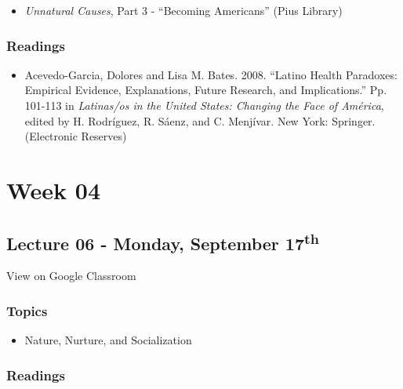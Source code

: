 \documentclass[]{book}
\providecommand{\tightlist}{%
  \setlength{\itemsep}{0pt}\setlength{\parskip}{0pt}}
\theoremstyle{definition}
\theoremstyle{definition}
\theoremstyle{definition}
\theoremstyle{remark}
\begin{document}
\begin{itemize}
\tightlist
\item
  \emph{Unnatural Causes}, Part 3 - ``Becoming Americans'' (Pius
  Library)
\end{itemize}

\hypertarget{readings-5}{%
\subsubsection*{Readings}\label{readings-5}}

\begin{itemize}
\tightlist
\item
  Acevedo-Garcia, Dolores and Lisa M. Bates. 2008. ``Latino Health
  Paradoxes: Empirical Evidence, Explanations, Future Research, and
  Implications.'' Pp. 101-113 in \emph{Latinas/os in the United States:
  Changing the Face of América}, edited by H. Rodríguez, R. Sáenz, and
  C. Menjívar. New York: Springer. (Electronic Reserves)
\end{itemize}

\hypertarget{week-04}{%
\section*{Week 04}\label{week-04}}

\hypertarget{lecture-06---monday-september-17th}{%
\subsection*{\texorpdfstring{Lecture 06 - Monday, September
17\textsuperscript{th}}{Lecture 06 - Monday, September 17th}}\label{lecture-06---monday-september-17th}}

View on Google Classroom

\hypertarget{topics-6}{%
\subsubsection*{Topics}\label{topics-6}}

\begin{itemize}
\tightlist
\item
  Nature, Nurture, and Socialization
\end{itemize}

\hypertarget{readings-6}{%
\subsubsection*{Readings}\label{readings-6}}
\end{document}
